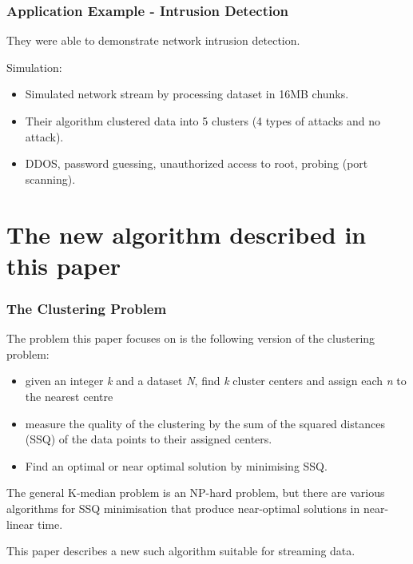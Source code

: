 \documentclass{beamer}
\begin{document}
\frame
{
  \frametitle{Application Example - Intrusion Detection}

  They were able to demonstrate network intrusion detection. \newline

  Simulation:
  \begin{itemize}
    \item Simulated network stream by processing dataset in 16MB chunks.
    \item Their algorithm clustered data into 5 clusters (4 types of attacks and no attack).
    \item DDOS, password guessing, unauthorized access to root, probing (port scanning). 
  \end{itemize}
}

\section{The new algorithm described in this paper}

\frame
{
  \frametitle{The Clustering Problem}

  The problem this paper focuses on is the following version of the
  clustering problem: 
  
  \begin{itemize}
  \item given an integer {\em k} and a dataset {\em N}, find {\em k}
    cluster centers and assign each {\em n} to the nearest centre
  \item measure the quality of the clustering by the sum of the
    squared distances (SSQ) of the data points to their assigned centers.
  \item Find an optimal or near optimal solution by minimising SSQ.
  \end{itemize}

  The general K-median problem is an NP-hard problem, but there are
  various algorithms for SSQ minimisation that produce near-optimal
  solutions in near-linear time.

  \bigskip
  This paper describes a new such algorithm suitable for streaming
  data.
  
}
\end{document}
